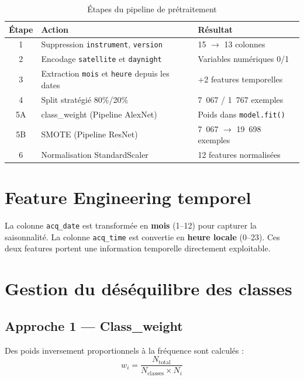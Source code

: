\documentclass[12pt,a4paper]{report}
\begin{document}
\begin{table}[H]
\centering
\begin{tabular}{|c|l|l|}
\hline
\rowcolor{bleu!15}
\textbf{\'{E}tape} & \textbf{Action} & \textbf{R\'{e}sultat} \\
\hline
1 & Suppression \texttt{instrument}, \texttt{version} & 15 $\rightarrow$ 13 colonnes \\
\hline
2 & Encodage \texttt{satellite} et \texttt{daynight} & Variables num\'{e}riques 0/1 \\
\hline
3 & Extraction \texttt{mois} et \texttt{heure} depuis les dates & +2 features temporelles \\
\hline
4 & Split strat\'{e}gi\'{e} 80\%/20\% & 7~067 / 1~767 exemples \\
\hline
5A & class\_weight (Pipeline AlexNet) & Poids dans \texttt{model.fit()} \\
\hline
5B & SMOTE (Pipeline ResNet) & 7~067 $\rightarrow$ 19~698 exemples \\
\hline
6 & Normalisation StandardScaler & 12 features normalis\'{e}es \\
\hline
\end{tabular}
\caption{\'{E}tapes du pipeline de pr\'{e}traitement}
\label{tab:pipeline}
\end{table}

\section{Feature Engineering temporel}

La colonne \texttt{acq\_date} est transform\'{e}e en \textbf{mois} (1--12) pour capturer la saisonnalit\'{e}. La colonne \texttt{acq\_time} est convertie en \textbf{heure locale} (0--23). Ces deux features portent une information temporelle directement exploitable.

\section{Gestion du d\'{e}s\'{e}quilibre des classes}

\subsection{Approche 1 --- Class\_weight}

Des poids inversement proportionnels \`{a} la fr\'{e}quence sont calcul\'{e}s :
\begin{equation}
w_i = \frac{N_{\text{total}}}{N_{\text{classes}} \times N_i}
\end{equation}
\end{document}
